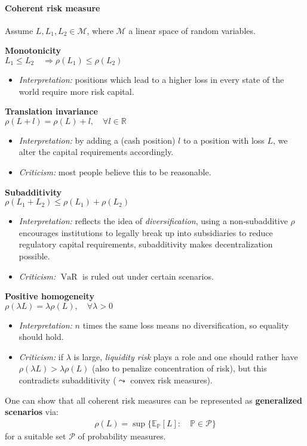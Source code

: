 \documentclass[a4paper,landscape,8pt,fleqn]{scrartcl}
\renewcommand{\emph}[1]{\textbf{#1}}
\DeclareMathOperator{\VaR}{VaR}				%
\begin{document}
\begin{multicols*}{3}
\paragraph{Coherent risk measure}
Assume $L, L_1, L_2 \in \mathcal{M}$, where $\mathcal{M}$ a linear space of random variables.
\begin{description}[style=multiline,leftmargin=1.3cm,font=\textbf]
\item[Axiom 1] \emph{Monotonicity} \\
$L_1 \leq L_2  \quad \Rightarrow \rho(L_1) \leq \rho(L_2)$
\begin{itemize}
\item \textit{Interpretation:} positions which lead to a higher loss in every state of the world require more risk capital.
\end{itemize}
\item[Axiom 2] \emph{Translation invariance} \\
$\rho(L + l) = \rho(L) + l, \quad \forall l \in \mathbb{R}$
\begin{itemize}
\item \textit{Interpretation:} by adding a (cash position) $l$ to a position with loss $L$, we alter the capital requirements accordingly.
\item \textit{Criticism:} most people believe this to be reasonable.
\end{itemize}
\item[Axiom 3] \emph{Subadditivity} \\
$\rho(L_1 + L_2) \leq \rho(L_1) + \rho(L_2)$
\begin{itemize}
\item \textit{Interpretation:} reflects the idea of \textit{diversification}, using a non-subadditive $\rho$ encourages institutions to legally break up into subsidiaries to reduce regulatory capital requirements, subadditivity makes decentralization possible.
\item \textit{Criticism:} $\VaR$ is ruled out under certain scenarios.
\end{itemize}
\item[Axiom 4] \emph{Positive homogeneity} \\
$\rho(\lambda L) = \lambda \rho(L), \quad \forall \lambda > 0$
\begin{itemize}
\item \textit{Interpretation:} $n$ times the same loss means no diversification, so equality should hold.
\item \textit{Criticism:} if $\lambda$ is large, \textit{liquidity risk} plays a role and one should rather have $\rho(\lambda L) > \lambda \rho(L)$ (also to penalize concentration of risk), but this contradicts subadditivity ($\leadsto$ convex risk measures).
\end{itemize}
\end{description}
One can show that all coherent risk measures can be represented as \emph{generalized scenarios} via:
\begin{align*}
\rho(L) = \sup \lbrace \mathbb{E}_\mathbb{P}[L] : \quad \mathbb{P} \in \mathcal{P} \rbrace
\end{align*}
for a suitable set $\mathcal{P}$ of probability measures.


\end{multicols*}
\end{document}
